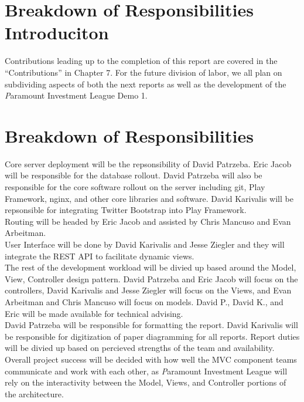 \newpage
\section{Breakdown of Responsibilities Introduciton}

Contributions leading up to the completion of this report are covered in the
``Contributions'' in Chapter 7. For the future division of labor, we all plan
on subdividing aspects of both the next reports as well as the development of
the {\textit Paramount Investment League} Demo 1.

\section{Breakdown of Responsibilities}

Core server deployment will be the repsonsibility of David Patrzeba.  Eric Jacob will
be responsible for the database rollout.  David Patrzeba will also be responsible for
the core software rollout on the server including git, Play Framework, nginx, and other
core libraries and software.  David Karivalis will be repsonsible for integrating
Twitter Bootstrap into Play Framework.\\

Routing will be headed by Eric Jacob and assisted by Chris Mancuso and Evan Arbeitman.\\

User Interface will be done by David Karivalis and Jesse Ziegler and they will integrate
the REST API to facilitate dynamic views.\\

The rest of the development workload will be divied up based around the Model, View,
Controller design pattern.  David Patrzeba and Eric Jacob will focus on the controllers,
David Karivalis and Jesse Ziegler will focus on the Views, and Evan Arbeitman and Chris
Mancuso will focus on models.  David P., David K., and Eric will be made available
for technical advising.\\

David Patrzeba will be responsible for formatting the report. David Karivalis will be
responsible for digitization of paper diagramming for all reports.  Report duties will
be divied up based on percieved strengths of the team and availability.\\

Overall project success will be decided with how well the MVC component teams communicate
and work with each other, as {\textit Paramount Investment League} will rely on the
interactivity between the Model, Views, and Controller portions of the architecture.\\

